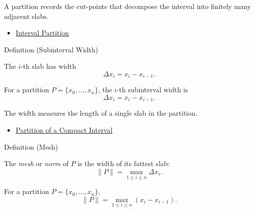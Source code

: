 \begin{remark*}[Interpretation]
A partition records the cut-points that decompose the interval into finitely
many adjacent slabs.
\end{remark*}

\begin{dependencies}
\begin{itemize}
  \item \hyperref[def:interval-partition]{Interval Partition}
\end{itemize}
\end{dependencies}

\begin{definitionbox}{Definition (Subinterval Width)}
\begin{definition}
\label{def:subinterval-width-integration}
The \(i\)-th slab has width
\[
  \Delta x_i=x_i-x_{i-1}.
\]
\end{definition}
\end{definitionbox}

\begin{remark*}
For a partition \(P=\{x_0,\ldots,x_n\}\), the \(i\)-th subinterval width is
\[
  \Delta x_i=x_i-x_{i-1}.
\]
\end{remark*}

\begin{remark*}[Interpretation]
The width measures the length of a single slab in the partition.
\end{remark*}

\begin{dependencies}
\begin{itemize}
  \item \hyperref[def:integration-partition]{Partition of a Compact Interval}
\end{itemize}
\end{dependencies}

\begin{definitionbox}{Definition (Mesh)}
\begin{definition}
\label{def:partition-mesh}
The \emph{mesh} or \emph{norm} of \(P\) is the width of its fattest slab:
\[
  \|P\|=\max_{1\le i\le n}\Delta x_i.
\]
\end{definition}
\end{definitionbox}

\begin{remark*}
For a partition \(P=\{x_0,\ldots,x_n\}\),
\[
  \|P\|=\max_{1\le i\le n}(x_i-x_{i-1}).
\]
\end{remark*}

